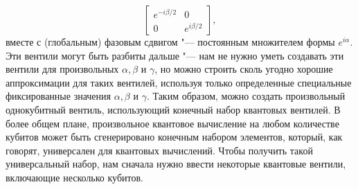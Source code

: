 \begin{multicols}{2}
{        \begin{equation}
            \begin{bmatrix}
                e^{-i\beta/2}& 0\\
                0& e^{i\beta/2}
            \end{bmatrix},
        \end{equation}
        вместе с (глобальным) фазовым сдвигом "--- постоянным множителем формы $e^{i\alpha}$. Эти вентили
        могут быть разбиты дальше "--- нам не нужно уметь создавать эти вентили для произвольных
        $\alpha, \beta$ и $\gamma$, но можно строить сколь угодно хорошие аппроксимации для таких вентилей, используя только определенные
        специальные фиксированные значения $\alpha, \beta$ и $\gamma$. Таким образом, можно создать произвольный однокубитный вентиль, использующий конечный набор квантовых вентилей. В более общем плане, произвольное квантовое
        вычисление на любом количестве кубитов может быть сгенерировано конечным набором элементов, который, как говорят, универсален для квантовых вычислений. Чтобы получить такой универсальный набор, нам сначала нужно
        ввести некоторые квантовые вентили, включающие несколько кубитов.
    }\\

\end{multicols}

